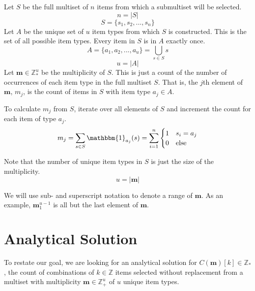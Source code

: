 \documentclass{article}
\begin{document}
Let $S$ be the full multiset of $n$ items from which a submultiset will be selected.
\begin{equation}
    n = \left | S \right | 
\end{equation} 
\begin{equation}
    S = \{ s_1, s_2, ..., s_n\}
\end{equation} 
Let $A$ be the unique set of $u$ item types from which $S$ is constructed. This is the set of all possible item types. Every item in $S$ is in $A$ exactly once.
\begin{equation}
    A = \{ a_1, a_2, ..., a_u\} = \bigcup_{s\in S} s
\end{equation} 
\begin{equation}
    u = \left | A \right | 
\end{equation} 
Let $\bm{m} \in \mathbb{Z}_{*}^{u}$ be the multiplicity of $S$. This is just a count of the number of occurrences of each item type in the full multiset $S$. That is, the $j$th element of $\bm{m}$, $m_j$, is the count of items in $S$ with item type $a_j \in A$.

To calculate $m_j$ from $S$, iterate over all elements of $S$ and increment the count for each item of type $a_j$.
\begin{equation}
    m_j = \sum_{s \in S} \mathbbm{1}_{a_j}(s) = \sum_{i = 1}^n \begin{cases}1 & s_i = a_j \\ 0 & \text{else} \end{cases}
\end{equation} 

Note that the number of unique item types in $S$ is just the size of the multiplicity.
\begin{equation}
    u = |\bm{m}|
\end{equation} 

We will use sub- and superscript notation to denote a range of $\bm{m}$. As an example, $\bm{m}_{1}^{u - 1}$ is all but the last element of $\bm{m}$.

\section{Analytical Solution}

To restate our goal, we are looking for an analytical solution for $C(\bm{m})[k] \in \mathbb{Z}_{*}$, the count of combinations of $k \in \mathbb{Z}$ items selected without replacement from a multiset with multiplicity $\bm{m} \in \mathbb{Z}_{+}^u$ of $u$ unique item types.
\end{document}
